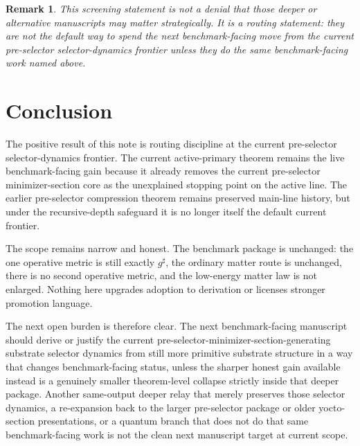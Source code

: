\documentclass[11pt]{article}
\newcommand{\CompletedMetric}{g^{\sharp}}
\newtheorem{remark}{Remark}
\begin{document}
\begin{remark}
This screening statement is not a denial that those deeper or alternative manuscripts may matter strategically. It is a routing statement: they are not the default way to spend the next benchmark-facing move from the current pre-selector selector-dynamics frontier unless they do the same benchmark-facing work named above.
\end{remark}

\section{Conclusion}

The positive result of this note is routing discipline at the current pre-selector selector-dynamics frontier. The current active-primary theorem remains the live benchmark-facing gain because it already removes the current pre-selector minimizer-section core as the unexplained stopping point on the active line. The earlier pre-selector compression theorem remains preserved main-line history, but under the recursive-depth safeguard it is no longer itself the default current frontier.

The scope remains narrow and honest. The benchmark package is unchanged: the one operative metric is still exactly \(\CompletedMetric\), the ordinary matter route is unchanged, there is no second operative metric, and the low-energy matter law is not enlarged. Nothing here upgrades adoption to derivation or licenses stronger promotion language.

The next open burden is therefore clear. The next benchmark-facing manuscript should derive or justify the current pre-selector-minimizer-section-generating substrate selector dynamics from still more primitive substrate structure in a way that changes benchmark-facing status, unless the sharper honest gain available instead is a genuinely smaller theorem-level collapse strictly inside that deeper package. Another same-output deeper relay that merely preserves those selector dynamics, a re-expansion back to the larger pre-selector package or older yocto-section presentations, or a quantum branch that does not do that same benchmark-facing work is not the clean next manuscript target at current scope.
\end{document}
